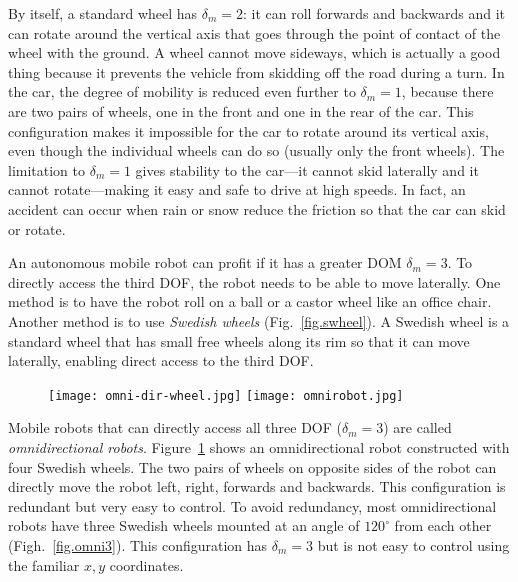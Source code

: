 By itself, a standard wheel has $\delta_m=2$: it can roll forwards and backwards and it can rotate around the vertical axis that goes through the point of contact of the wheel with the ground. A wheel cannot move sideways, which is actually a good thing because it prevents the vehicle from skidding off the road during a turn. In the car, the degree of mobility is reduced even further to $\delta_m=1$, because there are two pairs of wheels, one in the front and one in the rear of the car. This configuration makes it impossible for the car to rotate around its vertical axis, even though the individual wheels can do so (usually only the front wheels). The limitation to $\delta_m=1$ gives stability to the car---it cannot skid laterally and it cannot rotate---making it easy and safe to drive at high speeds. In fact, an accident can occur when rain or snow reduce the friction so that the car can skid or rotate.

An autonomous mobile robot can profit if it has a greater DOM $\delta_m = 3$. To directly access the third DOF, the robot needs to be able to move laterally. One method is to have the robot roll on a ball or a castor wheel like an office chair. Another method is to use \emph{Swedish wheels} (Fig.~\ref{fig.swheel}). A Swedish wheel is a standard wheel that has small free wheels along its rim so that it can move laterally, enabling direct access to the third DOF.

\begin{figure}
\subfigures
\leftfigure
{
\texttt{[image: omni-dir-wheel.jpg]}
}
\hspace{\fill}
\rightfigure
{
\texttt{[image: omnirobot.jpg]}
}
\label{fig.swheel}
\label{fig.omni-robot}
\end{figure}

Mobile robots that can directly access all three DOF ($\delta_m=3$) are called \emph{omnidirectional robots}\label{omnidirectional robot}. Figure~\ref{fig.omni-robot} shows an omnidirectional robot constructed with four Swedish wheels. The two pairs of wheels on opposite sides of the robot can directly move the robot left, right, forwards and backwards. This configuration is redundant but very easy to control. To avoid redundancy, most omnidirectional robots have three Swedish wheels mounted at an angle of $120^\circ$ from each other (Figh.~\ref{fig.omni3}). This configuration has $\delta_m=3$ but is not easy to control using the familiar $x,y$ coordinates.

